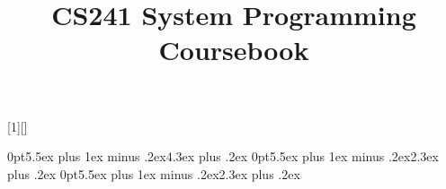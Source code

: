 \usepackage[Bjornstrup]{fncychap}
\singlespacing
\title{\vspace{-15mm}\fontsize{24pt}{10pt}\selectfont\textbf{CS241 System Programming Coursebook}}
\date{}

\newcommand{\keyword}[1]{\underline{\smash{\textbf{\texttt{#1}}}}}
\newcommand{\todo}[1]{}
\renewcommand{\todo}[1]{{\color{red} TODO: {#1}}}
[1][]%
  {\noindent\minipage{\linewidth}\medskip
   \lstset{basicstyle=\ttfamily\footnotesize,frame=single,#1}}
  {\endminipage}

\newenvironment{proof}{\begin{shaded*}\paragraph{Proof:}}{\hfill$\square$\end{shaded*}}
\newenvironment{tableau}{\begin{shaded*}\begin{longtable}}{\end{longtable}\end{shaded*}}
\usepackage{wrapfig}


\usepackage{csquotes}

  {\noindent\minipage{\linewidth}\medskip 
   \lstset{basicstyle=\ttfamily\footnotesize,frame=single,language=#1}}
  {\endminipage}

\usepackage{float}


\usepackage[compact]{titlesec}

\titlespacing*{\section}
{0pt}{5.5ex plus 1ex minus .2ex}{4.3ex plus .2ex}
\titlespacing*{\subsection}
{0pt}{5.5ex plus 1ex minus .2ex}{2.3ex plus .2ex}
\titlespacing*{\subsubsection}
{0pt}{5.5ex plus 1ex minus .2ex}{2.3ex plus .2ex}


